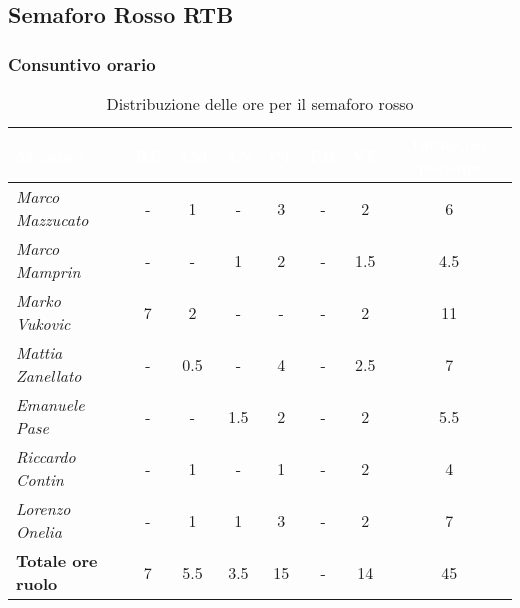 \subsection{Semaforo Rosso RTB}
\subsubsection{Consuntivo orario}
\begin{table}[H]
    \renewcommand\arraystretch{1.5}
    \small
    \centering
    \begin{adjustwidth}{-1.15cm}{}
        \begin{tabular}{|l|c|c|c|c|c|c|c|}
            \hline
            \rowcolor[HTML]{036400}
            \textcolor{white}{\textbf{Membro}} & \multicolumn{1}{c|}{\textcolor{white}{\textbf{RE}}} & \multicolumn{1}{c|}{\textcolor{white}{\textbf{AM}}} & \multicolumn{1}{c|}{\textcolor{white}{\textbf{AN}}} & \multicolumn{1}{c|}{\textcolor{white}{\textbf{PT}}} & \multicolumn{1}{c|}{\textcolor{white}{\textbf{PR}}} & \multicolumn{1}{c|}{\textcolor{white}{\textbf{VE}}} & \multicolumn{1}{c|}{\textcolor{white}{\textbf{Totale ore persona}}} \\ \hline
            \rowcolor[HTML]{EFEFEF}\textit{Marco Mazzucato}  & -        & 1          & -          & 3          & -        & 2        & 6       \\ \hline
            \rowcolor[HTML]{C0C0C0}\textit{Marco Mamprin}    & -        & -          & 1          & 2          & -        & 1.5      & 4.5       \\ \hline
            \rowcolor[HTML]{EFEFEF}\textit{Marko Vukovic}    & 7        & 2          & -          & -          & -        & 2        & 11       \\ \hline
            \rowcolor[HTML]{C0C0C0}\textit{Mattia Zanellato} & -        & 0.5        & -          & 4          & -        & 2.5      & 7       \\ \hline
            \rowcolor[HTML]{EFEFEF}\textit{Emanuele Pase}    & -        & -          & 1.5        & 2          & -        & 2        & 5.5       \\ \hline
            \rowcolor[HTML]{C0C0C0}\textit{Riccardo Contin}  & -        & 1          & -          & 1          & -        & 2        & 4       \\ \hline
            \rowcolor[HTML]{EFEFEF}\textit{Lorenzo Onelia}   & -        & 1          & 1          & 3          & -        & 2        & 7       \\ \hline
            \rowcolor[HTML]{C0C0C0}\textbf{Totale ore ruolo} & 7        & 5.5        & 3.5        & 15         & -        & 14       & 45       \\ \hline
        \end{tabular}
    \end{adjustwidth}
    \caption{Distribuzione delle ore per il semaforo rosso}
\end{table}


